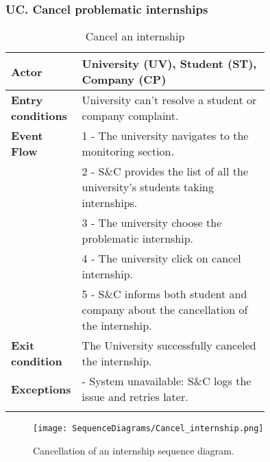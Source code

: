 \subsubsection*{UC\cuc . Cancel problematic internships}
\begin{center}
    \begin{longtable}{|l|p{0.75\linewidth}|}
        \hline
        \textbf{Actor}            & University (UV), Student (ST), Company (CP) \\
        \hline
        \textbf{Entry conditions} & University can't resolve a student or company complaint. \\
        \hline
        \textbf{Event Flow}       & 1 - The university navigates to the monitoring section. \\
        & 2 - S\&C provides the list of all the university’s students taking
internships. \\
        & 3 - The university choose the problematic internship. \\
        & 4 - The university click on cancel internship. \\
        & 5 - S\&C informs both student and company about the cancellation of the internship. \\
        \hline
        \textbf{Exit condition}   & The University successfully canceled the internship. \\       
        \hline
        \textbf{Exceptions}       & - System unavailable: S\&C logs the issue and retries later. \\
        \hline
        \caption{Cancel an internship}
        \label{tab:cancel_internships_usecase}
    \end{longtable}
\end{center}

\begin{figure}[H]
    \begin{center}
        \texttt{[image: SequenceDiagrams/Cancel\_internship.png]}
        \caption{Cancellation of an internship sequence diagram.}
        \label{fig:cancel_internship_seqd}%
    \end{center}
\end{figure}


